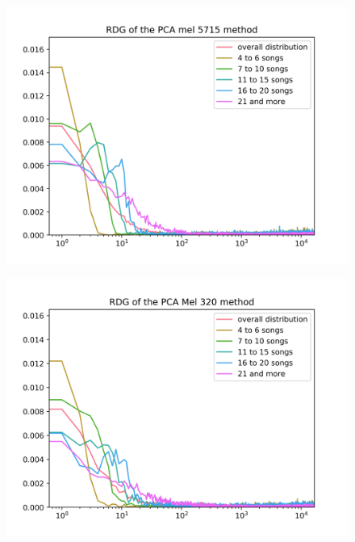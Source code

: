 \begin{figure}[h]
\centering
\begin{minipage}{.5\textwidth}
  \centering
  \includegraphics[width=1\linewidth]{./img/pca_mel_5715_graph.png}
  \label{fig:pca_mel_5715_distribution}
\end{minipage}%
\begin{minipage}{.5\textwidth}
  \centering
  \includegraphics[width=1\linewidth]{./img/pca_mel_320_graph.png}
  \label{fig:pca_mel_320_distribution}
\end{minipage}
\end{figure}\label{fig:pca_mel_comparison_graps}

